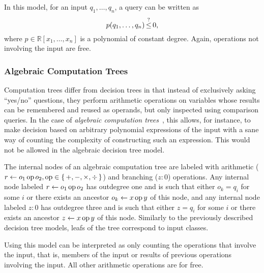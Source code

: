 In this model, for an input \(q_1,\ldots,q_n\), a query can be written as
\begin{displaymath}
	p(q_1, \ldots, q_n) \mathop{\le}^{?} 0,
\end{displaymath}
where \(p \in \mathbb{R}[x_1,\ldots, x_n]\) is a polynomial of constant
degree. Again, operations not involving the input are free.

\subsubsection{Algebraic Computation Trees}
Computation trees differ from decision trees in that instead of exclusively
asking
``yes/no'' questions, they perform arithmetic operations on variables whose
results can be remembered and reused as operands, but only inspected using
comparison queries.
In the case of \emph{algebraic computation trees}~\cite{Be83},
this allows, for instance, to make decision based on
arbitrary polynomial expressions of the input with a sane way of counting the
complexity of constructing such an expression. This would not be allowed in
the algebraic decision tree model.

The internal nodes of an algebraic computation tree are labeled with
arithmetic (\(r \gets o_1 \operatorname{op} o_2, \operatorname{op} \in \{\,+,-,\times,\div\,\}\)) and
branching (\(z : 0\)) operations. Any internal node labeled \(r \gets o_1 \operatorname{op}
o_2\) has outdegree one and is
such that either \(o_k = q_i\) for some \(i\) or there exists an ancestor \(o_k
\gets x \operatorname{op} y\) of this node, and any internal node labeled \(z : 0\) has
outdegree three and is such that either \(z = q_i\) for some \(i\) or there
exists an ancestor \(z \gets x \operatorname{op} y\) of this node.
Similarly to the previously described decision tree models, leafs of the tree
correspond to input classes.

Using this model can be interpreted as only counting the operations that
involve the input, that is, members of the input or results of previous
operations involving the input. All other arithmetic operations are for free.

